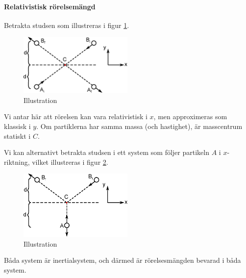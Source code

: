 \paragraph{Relativistisk rörelsemängd}
Betrakta studsen som illustreras i figur \ref{fig:collision_inertial}.
\begin{figure}[!ht]
	\centering
	\includegraphics[width = 0.5\textwidth]{./Images/collision_inertial.eps}
	\caption{Illustration}
	\label{fig:collision_inertial}
\end{figure}

Vi antar här att rörelsen kan vara relativistisk i $x$, men approximeras som klassisk i $y$. Om partiklerna har samma massa (och hastighet), är masscentrum statiskt i $C$.

Vi kan alternativt betrakta studsen i ett system som följer partikeln $A$ i $x$-riktning, vilket illustreras i figur \ref{fig:collision_following}.
\begin{figure}[!ht]
	\centering
	\includegraphics[width = 0.5\textwidth]{./Images/collision_following.eps}
	\caption{Illustration}
	\label{fig:collision_following}
\end{figure}

Båda system är inertialsystem, och därmed är rörelsesmängden bevarad i båda system.

